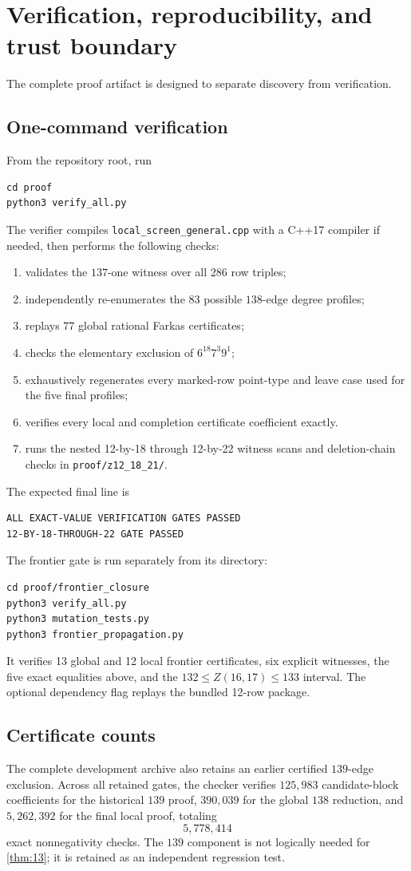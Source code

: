 \documentclass[11pt]{amsart}
\begin{document}
\section{Verification, reproducibility, and trust boundary}
The complete proof artifact is designed to separate discovery from verification.

\subsection{One-command verification}
From the repository root, run
\begin{verbatim}
cd proof
python3 verify_all.py
\end{verbatim}
The verifier compiles \texttt{local\_screen\_general.cpp} with a C++17 compiler if needed, then performs the following checks:
\begin{enumerate}[label=\arabic*.]
\item validates the $137$-one witness over all $286$ row triples;
\item independently re-enumerates the $83$ possible $138$-edge degree profiles;
\item replays $77$ global rational Farkas certificates;
\item checks the elementary exclusion of $6^{18}7^3 9^1$;
\item exhaustively regenerates every marked-row point-type and leave case used for the five final profiles;
\item verifies every local and completion certificate coefficient exactly.
\item runs the nested 12-by-18 through 12-by-22 witness scans and deletion-chain checks in \texttt{proof/z12\_18\_21/}.
\end{enumerate}
The expected final line is
\begin{verbatim}
ALL EXACT-VALUE VERIFICATION GATES PASSED
12-BY-18-THROUGH-22 GATE PASSED
\end{verbatim}
The frontier gate is run separately from its directory:
\begin{verbatim}
cd proof/frontier_closure
python3 verify_all.py
python3 mutation_tests.py
python3 frontier_propagation.py
\end{verbatim}
It verifies 13 global and 12 local frontier certificates, six explicit
witnesses, the five exact equalities above, and the $132\le Z(16,17)\le133$
interval. The optional dependency flag replays the bundled 12-row package.

\subsection{Certificate counts}
The complete development archive also retains an earlier certified $139$-edge exclusion. Across all retained gates, the checker verifies $125{,}983$ candidate-block coefficients for the historical $139$ proof, $390{,}039$ for the global $138$ reduction, and $5{,}262{,}392$ for the final local proof, totaling
\[
 5{,}778{,}414
\]
exact nonnegativity checks. The $139$ component is not logically needed for \cref{thm:13}; it is retained as an independent regression test.
\end{document}

